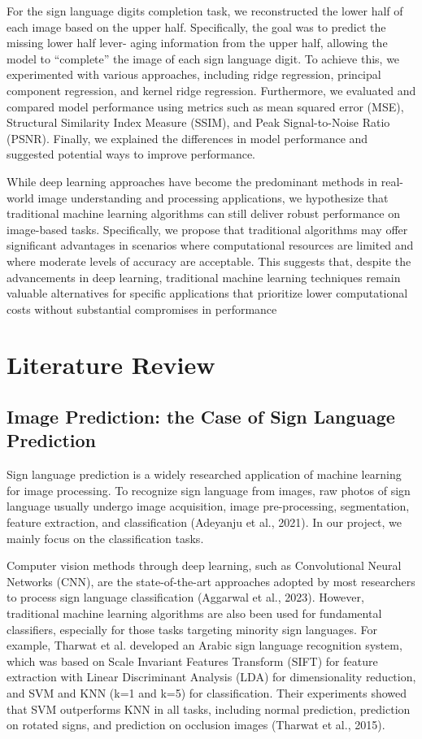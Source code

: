 \documentclass{article}
\begin{document}
For the sign language digits completion task, we reconstructed the lower half of each image based on the upper half. Specifically, the goal was to predict the missing lower half lever- aging information from the upper half, allowing the model to “complete” the image of each sign language digit. To achieve this, we experimented with various approaches, including ridge regression, principal component regression, and kernel ridge regression. Furthermore, we evaluated and compared model performance using metrics such as mean squared error (MSE), Structural Similarity Index Measure (SSIM), and Peak Signal-to-Noise Ratio (PSNR). Finally, we explained the differences in model performance and suggested potential ways to improve performance.

While deep learning approaches have become the predominant methods in real-world image understanding and processing applications, we hypothesize that traditional machine learning algorithms can still deliver robust performance on image-based tasks. Specifically, we propose that traditional algorithms may offer significant advantages in scenarios where computational resources are limited and where moderate levels of accuracy are acceptable. This suggests that, despite the advancements in deep learning, traditional machine learning techniques remain valuable alternatives for specific applications that prioritize lower computational costs without substantial compromises in performance

\section{Literature Review}
\subsection{Image Prediction: the Case of Sign Language Prediction}
Sign language prediction is a widely researched application of machine learning for image processing. To recognize sign language from images, raw photos of sign language usually undergo image acquisition, image pre-processing, segmentation, feature extraction, and classification (Adeyanju et al., 2021). In our project, we mainly focus on the classification tasks.

Computer vision methods through deep learning, such as Convolutional Neural Networks (CNN), are the state-of-the-art approaches adopted by most researchers to process sign language classification (Aggarwal et al., 2023). However, traditional machine learning algorithms are also been used for fundamental classifiers, especially for those tasks targeting minority sign languages. For example, Tharwat et al. developed an Arabic sign language recognition system, which was based on Scale Invariant Features Transform
(SIFT) for feature extraction with Linear Discriminant Analysis (LDA) for dimensionality reduction, and SVM and KNN (k=1 and k=5) for classification. Their experiments showed that SVM outperforms KNN in all tasks, including normal prediction, prediction on rotated signs, and prediction on occlusion images (Tharwat et al., 2015).
\end{document}
